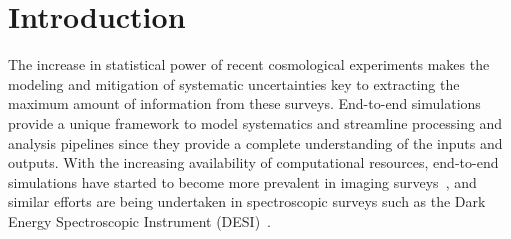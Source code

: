\documentclass[a4paper,fleqn,usenatbib]{mnras}
\begin{document}
\begin{abstract}


\end{abstract}



\section{Introduction}
\label{sec:intro}
The increase in statistical power of recent cosmological experiments makes the modeling and mitigation of systematic uncertainties key to extracting the maximum amount of information from these surveys. End-to-end simulations~\citep{Brun:118715, AGOSTINELLI2003250, 2006JHEP...05..026S} provide a unique framework to
model systematics and streamline processing and analysis pipelines since they provide a complete understanding of the inputs and outputs. With the increasing availability of computational resources, end-to-end simulations have started to become more prevalent in imaging surveys~\citep{2016ApJ...817...25B}, and similar efforts are being undertaken in spectroscopic surveys such as the Dark Energy Spectroscopic Instrument (DESI)~\citep{2016arXiv161100036D}.
\end{document}
